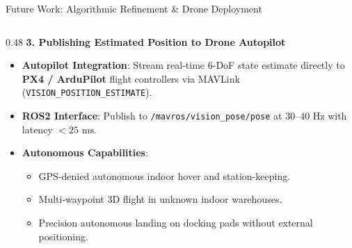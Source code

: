 \documentclass[aspectratio=169, 10pt]{beamer}
\begin{document}
\begin{frame}{Future Work: Algorithmic Refinement \& Drone Deployment}
\begin{columns}[T]
    \begin{column}{0.48\textwidth}
      {\small \textbf{\textcolor{NavyBlue}{3. Publishing Estimated Position to Drone Autopilot}}}
      \vspace{0.08cm}
      \scriptsize
      \begin{itemize}
        \setlength{\itemsep}{2pt}
        \item \textbf{Autopilot Integration}: Stream real-time 6-DoF state estimate directly to \textbf{PX4 / ArduPilot} flight controllers via MAVLink (\texttt{VISION\_POSITION\_ESTIMATE}).
        \item \textbf{ROS2 Interface}: Publish to \texttt{/mavros/vision\_pose/pose} at $30\text{--}40\text{ Hz}$ with latency $< 25\text{ ms}$.
        \item \textbf{Autonomous Capabilities}:
          \begin{itemize}
            \setlength{\itemsep}{1.5pt}
            \item GPS-denied autonomous indoor hover and station-keeping.
            \item Multi-waypoint 3D flight in unknown indoor warehouses.
            \item Precision autonomous landing on docking pads without external positioning.
          \end{itemize}
      \end{itemize}
    \end{column}
  \end{columns}
\end{frame}
\end{document}
